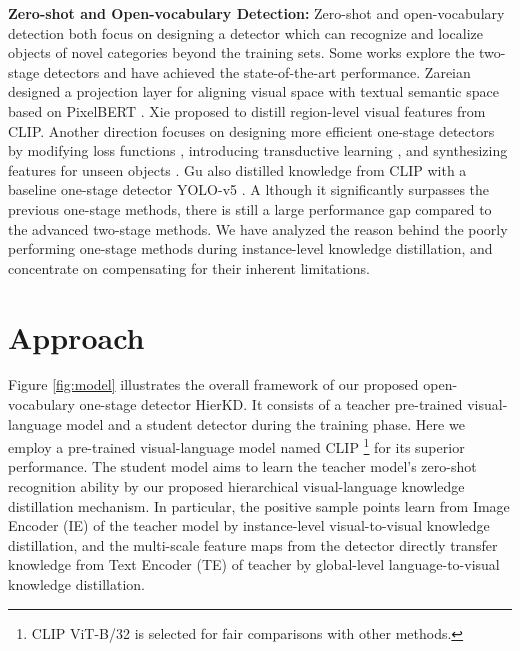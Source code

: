 \documentclass[10pt,twocolumn,letterpaper]{article}
\begin{document}
\noindent \textbf{Zero-shot and Open-vocabulary Detection:} Zero-shot and open-vocabulary detection both focus on designing a detector which can recognize and localize objects of novel categories beyond the training sets. Some works explore the two-stage detectors \cite{bansal2018zero,zareian2021open,xie2021zsd, zheng2021zero, li2019zero, zheng2020background} and have achieved the state-of-the-art performance. 
Zareian \etal \cite{zareian2021open} designed a projection layer for aligning visual space with textual semantic space based on PixelBERT \cite{huang2020pixel}. 
Xie \etal \cite{xie2021zsd} proposed to distill region-level visual features from CLIP. 
Another direction focuses on designing more efficient one-stage detectors by modifying loss functions \cite{rahman2020improved}, introducing transductive learning \cite{rahman2019transductive}, and synthesizing features for unseen objects \cite{zhu2020don}. 
Gu \etal \cite{gu2021zero} also distilled knowledge from CLIP with a baseline one-stage detector YOLO-v5 \cite{bochkovskiy2020yolov4}. A
lthough it significantly surpasses the previous one-stage methods, there is still a large performance gap compared to the advanced two-stage methods. We have analyzed the reason behind the poorly performing one-stage methods during instance-level knowledge distillation, and concentrate on compensating for their inherent limitations.

\section{Approach}
\label{sec: method}
Figure \ref{fig:model} illustrates the overall framework of our proposed open-vocabulary one-stage detector HierKD. It consists of a teacher pre-trained visual-language model and a student detector during the training phase. Here we employ a pre-trained visual-language model named CLIP \footnote{CLIP ViT-B/32 is selected for fair comparisons with other methods.} for its superior performance. The student model aims to learn the teacher model's zero-shot recognition ability by our proposed hierarchical visual-language knowledge distillation mechanism. In particular, the positive sample points learn from Image Encoder (IE) of the teacher model by instance-level visual-to-visual knowledge distillation, and the multi-scale feature maps from the detector directly transfer knowledge from Text Encoder (TE) of teacher by global-level language-to-visual knowledge distillation.
\end{document}
